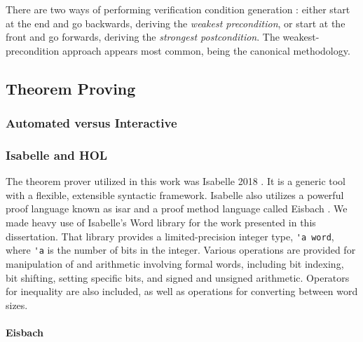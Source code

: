 There are two ways of performing verification condition generation%
:
either start at the end and go backwards, deriving the \emph{weakest precondition},%
or start at the front and go forwards, deriving the \emph{strongest postcondition}.%
The weakest-precondition approach appears most common,
being the canonical methodology.


\subsection{Theorem Proving}
%

\subsubsection{Automated versus Interactive}

\subsubsection{Isabelle and HOL}
The theorem prover utilized in this work
was Isabelle 2018 \autocite{nipkow2002isabelle}.%
It is a generic tool with a flexible, extensible syntactic framework.
Isabelle also utilizes a powerful proof language
known as \ac{isar}  \autocite{wenzel2007isabelle}
and a proof method language called Eisbach \autocite{matichuk2016eisbach}.
We made heavy use of Isabelle's Word library  \autocite{isabelle-word-session}
for the work presented in this dissertation.
That library provides a limited-precision integer type, \lstinline|'a word|,
where \lstinline|'a| is the number of bits in the integer.
Various operations are provided for manipulation of and arithmetic involving formal words,
including bit indexing, bit shifting, setting specific bits,
and signed and unsigned arithmetic.
Operators for inequality are also included,
as well as operations for converting between word sizes.

\paragraph{Eisbach}


